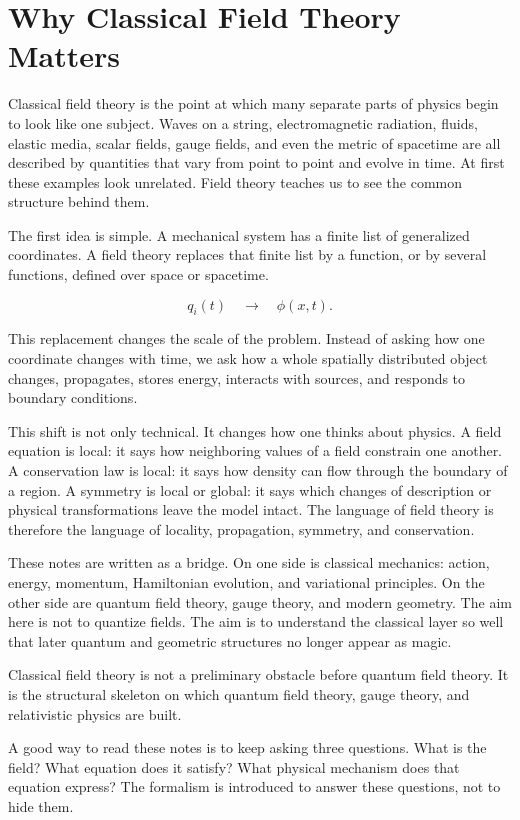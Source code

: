 \section{Why Classical Field Theory Matters}

Classical field theory is the point at which many separate parts of physics begin
to look like one subject. Waves on a string, electromagnetic radiation, fluids,
elastic media, scalar fields, gauge fields, and even the metric of spacetime are
all described by quantities that vary from point to point and evolve in time. At
first these examples look unrelated. Field theory teaches us to see the common
structure behind them.

The first idea is simple. A mechanical system has a finite list of generalized
coordinates. A field theory replaces that finite list by a function, or by
several functions, defined over space or spacetime. 

$$
q_i(t) \quad \longrightarrow \quad \phi(x,t).
$$

This replacement changes the scale of the problem. Instead of asking how one coordinate changes with time, we
ask how a whole spatially distributed object changes, propagates, stores energy,
interacts with sources, and responds to boundary conditions.

This shift is not only technical. It changes how one thinks about physics. A
field equation is local: it says how neighboring values of a field constrain one
another. A conservation law is local: it says how density can flow through the
boundary of a region. A symmetry is local or global: it says which changes of
description or physical transformations leave the model intact. The language of
field theory is therefore the language of locality, propagation, symmetry, and
conservation.

These notes are written as a bridge. On one side is classical mechanics: action,
energy, momentum, Hamiltonian evolution, and variational principles. On the other
side are quantum field theory, gauge theory, and modern geometry. The aim here is
not to quantize fields. The aim is to understand the classical layer so well that
later quantum and geometric structures no longer appear as magic.

\begin{remarkbox}
Classical field theory is not a preliminary obstacle before quantum field theory.
It is the structural skeleton on which quantum field theory, gauge theory, and
relativistic physics are built.
\end{remarkbox}

A good way to read these notes is to keep asking three questions. What is the
field? What equation does it satisfy? What physical mechanism does that equation
express? The formalism is introduced to answer these questions, not to hide them.
